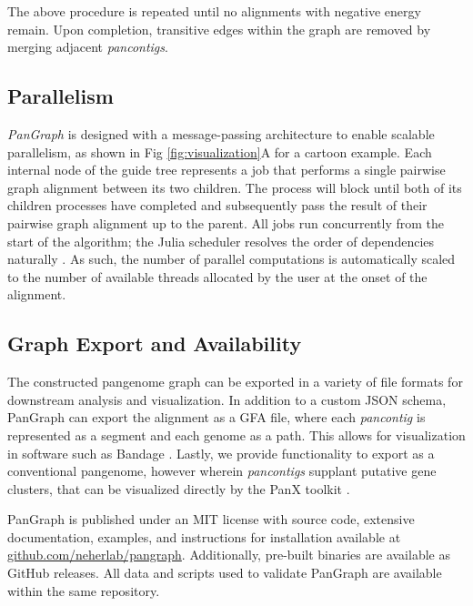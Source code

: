 \documentclass[aps,rmp,reprint,superscriptaddress,notitlepage,10pt]{revtex4-1}
\begin{document}
The above procedure is repeated until no alignments with negative energy remain.
Upon completion, transitive edges within the graph are removed by merging adjacent \emph{pancontigs}.

\subsection{Parallelism}
\emph{PanGraph} is designed with a message-passing architecture to enable scalable parallelism, as shown in Fig \ref{fig:visualization}A for a cartoon example.
Each internal node of the guide tree represents a job that performs a single pairwise graph alignment between its two children.
The process will block until both of its children processes have completed and subsequently pass the result of their pairwise graph alignment up to the parent.
All jobs run concurrently from the start of the algorithm; the Julia scheduler resolves the order of dependencies naturally \cite{bezanson2017julia}.
As such, the number of parallel computations is automatically scaled to the number of available threads allocated by the user at the onset of the alignment.

\subsection{Graph Export and Availability}
The constructed pangenome graph can be exported in a variety of file formats for downstream analysis and visualization.
In addition to a custom JSON schema, PanGraph can export the alignment as a GFA file, where each \emph{pancontig} is represented as a segment and each genome as a path.
This allows for visualization in software such as Bandage \cite{wick2015bandage}.
Lastly, we provide functionality to export as a conventional pangenome, however wherein \emph{pancontigs} supplant putative gene clusters, that can be visualized directly by the PanX toolkit \cite{ding2018panx}.

PanGraph is published under an MIT license with source code, extensive documentation, examples, and instructions for installation available at \url{github.com/neherlab/pangraph}.
Additionally, pre-built binaries are available as GitHub releases.
All data and scripts used to validate PanGraph are available within the same repository.
\end{document}
